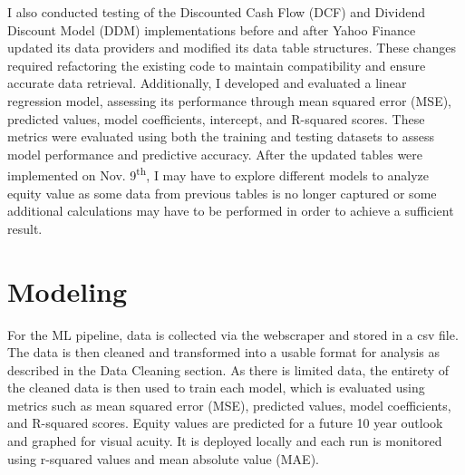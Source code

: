 \documentclass[runningheads]{llncs}
\begin{document}
I also conducted testing of the Discounted Cash Flow (DCF) and Dividend Discount Model (DDM) implementations before and after Yahoo Finance updated its data providers and modified its data table structures. These changes required refactoring the existing code to maintain compatibility and ensure accurate data retrieval. Additionally, I developed and evaluated a linear regression model, assessing its performance through mean squared error (MSE), predicted values, model coefficients, intercept, and R-squared scores. These metrics were evaluated using both the training and testing datasets to assess model performance and predictive accuracy. After the updated tables were implemented on Nov. 9\textsuperscript{th}, I may have to explore different models to analyze equity value as some data from previous tables is no longer captured or some additional calculations may have to be performed in order to achieve a sufficient result.



\section{Modeling}

For the ML pipeline, data is collected via the webscraper and stored in a csv file. The data is then cleaned and transformed into a usable format for analysis as described in the Data Cleaning section. As there is limited data, the entirety of the cleaned data is then used to train each model, which is evaluated using metrics such as mean squared error (MSE), predicted values, model coefficients, and R-squared scores. Equity values are predicted for a future 10 year outlook and graphed for visual acuity. It is deployed locally and each run is monitored using r-squared values and mean absolute value (MAE).
\end{document}
